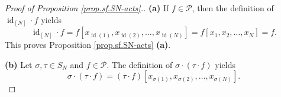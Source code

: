\begin{fineprint}
\begin{proof}
[Proof of Proposition \ref{prop.sf.SN-acts}.]\textbf{(a)} If $f\in\mathcal{P}%
$, then the definition of $\operatorname*{id}\nolimits_{\left[  N\right]
}\cdot f$ yields
\[
\operatorname*{id}\nolimits_{\left[  N\right]  }\cdot f=f\left[
x_{\operatorname*{id}\left(  1\right)  },x_{\operatorname*{id}\left(
2\right)  },\ldots,x_{\operatorname*{id}\left(  N\right)  }\right]  =f\left[
x_{1},x_{2},\ldots,x_{N}\right]  =f.
\]
This proves Proposition \ref{prop.sf.SN-acts} \textbf{(a)}. \medskip

\textbf{(b)} Let $\sigma,\tau\in S_{N}$ and $f\in\mathcal{P}$. The definition
of $\sigma\cdot\left(  \tau\cdot f\right)  $ yields%
\begin{equation}
\sigma\cdot\left(  \tau\cdot f\right)  =\left(  \tau\cdot f\right)  \left[
x_{\sigma\left(  1\right)  },x_{\sigma\left(  2\right)  },\ldots
,x_{\sigma\left(  N\right)  }\right]  . \label{pf.prop.sf.SN-acts.b.1}%
\end{equation}



\end{proof}
\end{fineprint}
